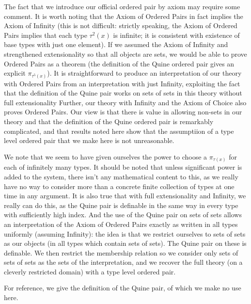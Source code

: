 \documentclass[12pt]{article}
\begin{document}
The fact that we introduce our official ordered pair by axiom may require some comment.  It is worth noting that the Axiom of Ordered Pairs in fact implies the
Axiom of Infinity (this is not difficult: strictly speaking, the Axiom of Ordered Pairs implies that each type $\tau^2(x)$ is infinite;  it is consistent with existence of base types with just one element).  If we assumed the Axiom of Infinity and strengthened extensionality so that all objects are sets, we would be able
to prove Ordered Pairs as a theorem (the definition of the Quine ordered pair gives an explicit $\pi_{\tau^5(x)}$).  It is straightforward to  produce an interpretation of our
theory with Ordered Pairs from an interpretation with just Infinity, exploiting the fact that the definition of the Quine pair works on sets of sets in this theory without full extensionality  Further, our theory with Infinity and the Axiom of Choice also proves Ordered Pairs.  Our view
is that there is value in allowing non-sets in our theory and that the definition of the Quine ordered pair is remarkably complicated, and that results noted here show that
the assumptiion of a type level ordered pair that we make here is not unreasonable.

We note that we seem to have given ourselves the power to choose a $\pi_{\tau(x)}$ for each of infinitely many types.  It should be noted that unless significant power is added to the system, there isn't any mathematical content to this, as we really have no way to consider more than a concrete finite collection of types at one time in any argument.  It is also true that with full extensionality and Infinity, we really can do this, as the Quine pair is definable in the same way in every type with sufficiently high index.  And the use of the Quine pair on sets of sets
allows an interpretation of the Axiom of Ordered Pairs exactly as written in all types uniformly (assuming Infinity):  the idea is that we restrict ourselves to sets of sets as our objects (in all types which contain sets of sets).  The Quine pair on these is definable.  We then restrict the membership relation so we consider only sets of sets of sets as the sets of the interpretation, and we recover the full theory (on a cleverly restricted domain) with a type level ordered pair.

For reference, we give the definition of the Quine pair, of which we make no use here.
\end{document}
